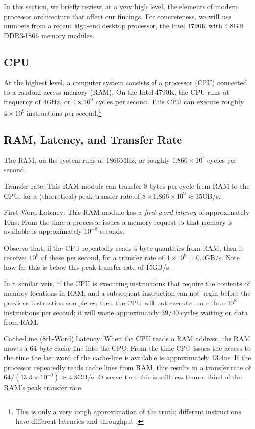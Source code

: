 \documentclass{patmorin}
\begin{document}
In this section, we briefly review, at a very high level, the elements of
modern processor architecture that affect our findings.  For concreteness,
we will use numbers from a recent high-end desktop processor, the Intel
4790K \cite{S} with 4 8GB DDR3-1866 memory modules.

\subsection{CPU}

At the highest level, a computer system consists of a processor (CPU)
connected to a random access memory (RAM). On the Intel 4790K, the CPU
runs at frequency of 4GHz, or $4\times10^9$ cycles per second.  This CPU
can execute roughly $4\times 10^{9}$ instructions per second.\footnote{This is only a very rough approximation of the truth; different instructions have different latencies and throughput \cite{granlund.instruction}.}


\subsection{RAM, Latency, and Transfer Rate}

The RAM, on ths system runs at 1866MHz, or roughly $1.866\times10^9$
cycles per second.

Transfer rate: This RAM module can transfer 8 bytes per cycle from RAM
to the CPU, for a (theoretical) peak transfer rate of 
$8\times 1.866\times10^9\approx 15$GB/s.

First-Word Latency: This RAM module has a \emph{first-word latency} of
approximately 10ns: From the time a processor issues a memory request
to that memory is available is approximately $10^{-8}$ seconds.

Observe that, if the CPU repeatedly reads 4 byte quantities from RAM,
then it receives $10^8$ of these per second, for a transfer rate of
$4\times 10^8=0.4$GB/s.  Note how far this is below this peak transfer
rate of 15GB/s.

In a similar vein, if the CPU is executing instructions that require
the contents of memory locations in RAM, and a subsequent instruction
can not begin before the previous instruction completes, then the CPU
will not execute more than $10^8$ instructions per second; it will waste
approximately 39/40 cycles waiting on data from RAM.

Cache-Line (8th-Word) Latency:  When the CPU reads a RAM address, the
RAM moves a 64 byte cache line into the CPU. From the time CPU issues
the access to the time the last word of the cache-line is available is
approximately 13.4ns.  If the processor repeatedly reads cache lines
from RAM, this results in a transfer rate of $64 / (13.4\times10^{-9})
\approx 4.8$GB/s.  Observe that this is still less than a third of the
RAM's peak transfer rate.
\end{document}
